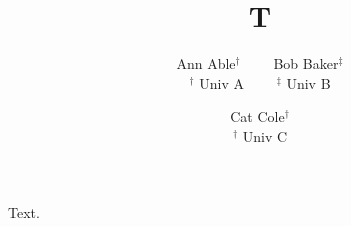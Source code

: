 \documentclass{article}
\title{T}
\author{Ann Able$^{\dagger}$ \ \ \ \ Bob Baker$^{\ddagger}$ \\ $^\dagger$ Univ A \ \ \ \ $^\ddagger$ Univ B \and Cat Cole$^{\dagger}$ \\ $^\dagger$ Univ C}
\begin{document}
\maketitle
Text.
\end{document}
